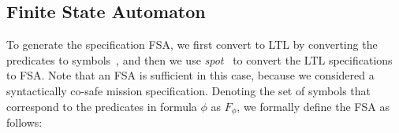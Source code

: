 \documentclass[conference]{IEEEtran}
\begin{document}
\subsection{Finite State Automaton}
\label{sec:FSA}
To generate the specification FSA, we first convert \DTL to LTL by converting the predicates to symbols~\cite{JonesDTL2013},
and then we use {\em spot}~\cite{duret14} to convert the LTL specifications to FSA.
Note that an FSA is sufficient in this case, because we considered a syntactically co-safe mission specification.
Denoting the set of symbols that correspond to the predicates in \DTL formula $\phi$ as $F_\phi$, we formally define the FSA as follows:

\end{document}
